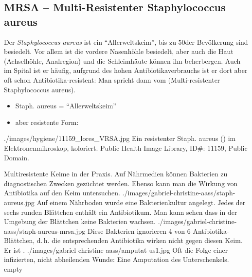 \subsection{MRSA -- Multi-Resistenter Staphylococcus
aureus} 



{%
Der \emph{Staphylococcus aureus} ist ein
\enquote{Allerweltskeim}, bis zu 50\PC* der Bevölkerung sind
besiedelt. Vor allem ist die vordere Nasenhöhle besiedelt,
aber auch die Haut (Achselhöhle, Analregion) und die
Schleimhäute können ihn beherbergen. Auch im Spital ist er
häufig, aufgrund des hohen Antibiotikaverbrauchs ist er dort
aber oft schon Antibiotika-resistent: Man spricht dann vom
 (Multi-resistenter Staphylococcus aureus).

\vspace{1cm}

}{
\begin{itemize}
    \item Staph. aureus = \enquote{Allerweltskeim}
    \item aber resistente Form:
\end{itemize}
}
{./images/hygiene/11159_lores_VRSA.jpg}
{Ein
resistenter Staph. aureus () im Elektronenmikroskop,
koloriert.}
{Public Health Image Library, ID\#: 11159, Public Domain.}



\begin{PictureSeriesWide}{}{Multiresistente Keime in der
Praxis. Auf Nährmedien können Bakterien zu diagnostischen
Zwecken gezüchtet werden. Ebenso kann man die Wirkung von
Antibiotika auf den Keim untersuchen.}
{./images/gabriel-christine-aass/staph-aureus.jpg}
{Auf einem Nährboden wurde eine Bakterienkultur
angelegt. Jedes der sechs runden Blättchen enthält ein Antibiotikum. Man kann
sehen dass in der Umgebung der Blättchen keine Bakterien wachsen.
}
{./images/gabriel-christine-aass/staph-aureus-mrsa.jpg}
{Diese Bakterien ignorieren 4 von 6
Antibiotika-Blättchen, d.\,h. die entsprechenden Antibiotika wirken
nicht gegen diesen Keim. Er ist .
}
{./images/gabriel-christine-aass/amputat-us1.jpg}
{Oft die Folge einer infizierten, nicht abheilenden
Wunde: Eine Amputation des Unterschenkels.
}
{empty}
{}
\end{PictureSeriesWide}



